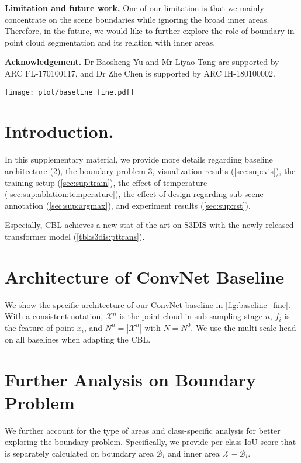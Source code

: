 \documentclass[10pt,twocolumn,letterpaper]{article}
\begin{document}
\noindent\textbf{Limitation and future work.}
One of our limitation is that we mainly concentrate on the scene boundaries while ignoring the broad inner areas. Therefore, in the future, we would like to further explore the role of boundary in point cloud segmentation and its relation with inner areas.

\noindent\textbf{Acknowledgement.}
Dr Baosheng Yu and Mr Liyao Tang are supported by ARC FL-170100117, and Dr Zhe Chen is supported by ARC IH-180100002.



{\small


}

\onecolumn
\newpage
\twocolumn

\appendix


\begin{figure*}
\centering
    \texttt{[image: plot/baseline\_fine.pdf]}
    \caption{The detail architecture of ConvNet baseline.}
    \label{fig:baseline_fine}
\end{figure*}

\section{Introduction.}
In this supplementary material, we provide more details regarding baseline architecture (\cref{sec:sup:baseline}), the boundary problem \cref{sec:sup:bound}, visualization results (\cref{sec:sup:vis}), the training setup (\cref{sec:sup:train}), the effect of temperature (\cref{sec:sup:ablation:temperature}), the effect of design regarding sub-scene annotation (\cref{sec:sup:argmax}), and experiment results (\cref{sec:sup:rst}).

Especially, CBL achieves a new stat-of-the-art on S3DIS with the newly released transformer model (\cref{tbl:s3dis:pttrans}). 

\section{Architecture of ConvNet Baseline}
\label{sec:sup:baseline}
We show the specific architecture of our ConvNet baseline in \cref{fig:baseline_fine}. With a consistent notation, $\mathcal X^n$ is the point cloud in sub-sampling stage $n$, $f_i$ is the feature of point $x_i$, and $N^n = |\mathcal X^n|$ with $N=N^0$. We use the multi-scale head on all baselines when adapting the CBL.

\section{Further Analysis on Boundary Problem}
\label{sec:sup:bound}
We further account for the type of areas and class-specific analysis for better exploring the boundary problem. Specifically, we provide per-class IoU score that is separately calculated on boundary area $\mathcal B_l$ and inner area $\mathcal X-\mathcal B_l$.
\end{document}
